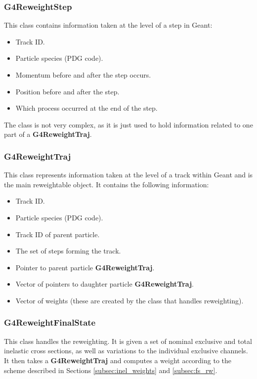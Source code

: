 \documentclass[12pt]{article}
\begin{document}
\subsubsection{G4ReweightStep}
This class contains information taken at the level of a step in Geant:
\begin{itemize}
	\item Track ID.
	\item Particle species (PDG code).
	\item Momentum before and after the step occurs.
	\item Position before and after the step.
	\item Which process occurred at the end of the step.
\end{itemize}

The class is not very complex, as it is just used to hold information related to one part of a \textbf{G4ReweightTraj}.

\subsubsection{G4ReweightTraj}
This class represents information taken at the level of a track within Geant and is the main reweightable object. It contains the following information:
\begin{itemize}
	\item Track ID.
	\item Particle species (PDG code).
	\item Track ID of parent particle.
	\item The set of steps forming the track.
	\item Pointer to parent particle \textbf{G4ReweightTraj}.
	\item Vector of pointers to daughter particle \textbf{G4ReweightTraj}.
	\item Vector of weights (these are created by the class that handles reweighting).
\end{itemize}

\subsubsection{G4ReweightFinalState}
This class handles the reweighting. It is given a set of nominal exclusive and total inelastic cross sections, as well as variations to the individual exclusive channels. It then takes a \textbf{G4ReweightTraj} and computes a weight according to the scheme described in Sections \ref{subsec:inel_weights} and \ref{subsec:fs_rw}.
\end{document}
